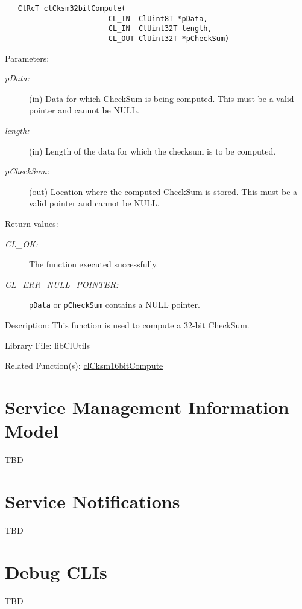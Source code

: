 \begin{flushleft}
\begin{Desc}
\footnotesize\begin{verbatim}   ClRcT clCksm32bitCompute(
           				CL_IN  ClUint8T *pData,
           				CL_IN  ClUint32T length,
           				CL_OUT ClUint32T *pCheckSum)
\end{verbatim}
\normalsize
\end{Desc}
\begin{Desc}
\item[Parameters:]
\begin{description}
\item[{\em p\-Data:}](in) Data for which Check\-Sum is being computed. This must be a valid pointer and cannot be NULL.
\item[{\em length:}](in) Length of the data for which the checksum is to be computed.
\item[{\em p\-Check\-Sum:}](out) Location where the computed CheckSum is stored. This must be a valid pointer and cannot be NULL.\end{description}
\end{Desc}
\begin{Desc}
\item[Return values:]
\begin{description}
\item[{\em CL\_\-OK:}]The function executed successfully. 
\item[{\em CL\_\-ERR\_\-NULL\_\-POINTER:}]{\tt{pData}} or {\tt{pCheckSum}} contains a NULL pointer.\end{description}
\end{Desc}
\begin{Desc}
\item[Description:]This function is used to compute a 32-bit Check\-Sum.\end{Desc}
\begin{Desc}
\item[Library File:]lib\-Cl\-Utils\end{Desc}
\begin{Desc}
\item[Related Function(s):]\hyperlink{pagecksm101}{cl\-Cksm16bit\-Compute} \end{Desc}


\chapter{Service Management Information Model}
TBD
\chapter{Service Notifications}
TBD
\chapter{Debug CLIs}
TBD
\end{flushleft}